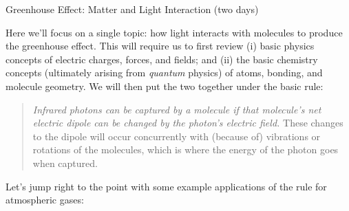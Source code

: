 \documentclass[12pt]{article}
\begin{document}
\begin{center}
{\Large Greenhouse Effect: Matter and Light Interaction (two days)}
\end{center}

\noindent Here we'll focus on a single topic: how light interacts with molecules to produce the greenhouse effect.  This will require us to first review (i) basic physics concepts of electric charges, forces, and fields; and (ii) the basic chemistry concepts (ultimately arising from {\em quantum} physics) of atoms, bonding, and molecule geometry.  We will then put the two together under the basic rule:
	\begin{quote}
	 {\em Infrared photons can be captured by a molecule if that molecule's net electric dipole can be changed by the photon's electric field.} These changes to the dipole will occur concurrently with (because of) vibrations or rotations of the molecules, which is where the energy of the photon goes when captured.
	\end{quote}
Let's jump right to the point with some example applications of the rule for atmospheric gases:
\end{document}
